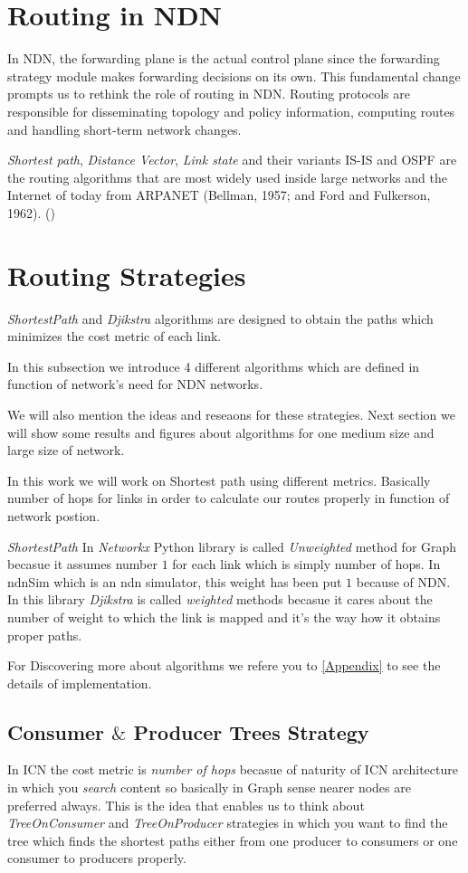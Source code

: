 \section{Routing in NDN}
In NDN, the forwarding plane is the actual control plane
since the forwarding strategy module makes forwarding decisions on its own.  This fundamental change prompts us
to rethink the role of routing in NDN. Routing protocols are responsible for disseminating topology and policy information, computing routes and handling short-term network changes.

\textit{Shortest path}, \textit{Distance Vector}, \textit{Link state} and their variants IS-IS and OSPF are the routing algorithms that are most widely used inside large networks and the Internet of today from ARPANET (Bellman, 1957; and Ford and Fulkerson, 1962). (\cite{modulation})


 
\section{Routing Strategies}
\textit{ShortestPath} and \textit{Djikstra} algorithms are designed to obtain the paths which minimizes the cost metric of each link. 

In this subsection we introduce 4 different algorithms which are defined in function of network's need for NDN networks.

We will also mention the ideas and reseaons for these strategies. Next section we will show some results and figures about algorithms for one medium size and large size of network.

In this work we will work on Shortest path using different metrics. Basically number of hops for links in order to calculate our routes properly in function of network postion.

\textit{ShortestPath} In \textit{Networkx} Python library is called \textit{Unweighted} method for Graph becasue it assumes number $1$ for each link which is simply number of hops. In ndnSim which is an ndn simulator, this weight has been put $1$ because of NDN. In this library \textit{Djikstra} is called \textit{weighted} methods becasue it cares about the number of weight to which the link is mapped and it's the way how it obtains proper paths. 

For Discovering more about algorithms we refere you to \ref{Appendix} to see the details of implementation. 

\subsection{Consumer $\&$ Producer Trees Strategy}
In ICN the cost metric is \textit{number of hops} becasue of naturity of ICN architecture in which you \textit{search} content so basically in Graph sense nearer nodes are preferred always. This is the idea that enables us to think about \textit{TreeOnConsumer} and \textit{TreeOnProducer} strategies in which you want to find the tree which finds the shortest paths either from one producer to consumers or one consumer to producers properly.

